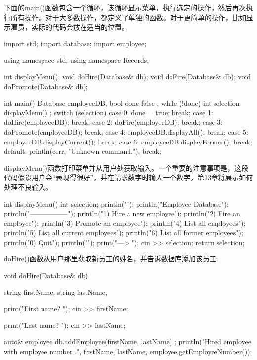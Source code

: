 下面的main()函数包含一个循环，该循环显示菜单，执行选定的操作，然后再次执行所有操作。对于大多数操作，都定义了单独的函数。对于更简单的操作，比如显示雇员，实际的代码会放在适当的位置。

\begin{cpp}
import std;
import database;
import employee;

using namespace std;
using namespace Records;

int displayMenu();
void doHire(Database& db);
void doFire(Database& db);
void doPromote(Database& db);

int main()
{
    Database employeeDB;
    bool done { false };
    while (!done) {
        int selection { displayMenu() };
        switch (selection) {
        case 0:
            done = true;
            break;
        case 1:
            doHire(employeeDB);
            break;
        case 2:
            doFire(employeeDB);
            break;
        case 3:
            doPromote(employeeDB);
            break;
        case 4:
            employeeDB.displayAll();
            break;
        case 5:
            employeeDB.displayCurrent();
            break;
        case 6:
            employeeDB.displayFormer();
            break;
        default:
            println(cerr, "Unknown command.");
            break;
        }
    }
}
\end{cpp}

displayMenu()函数打印菜单并从用户处获取输入。一个重要的注意事项是，这段代码假设用户会“表现得很好”，并在请求数字时输入一个数字。第13章将展示如何处理不良输入。

\begin{cpp}
int displayMenu()
{
    int selection;
    println("");
    println("Employee Database");
    println("-----------------");
    println("1) Hire a new employee");
    println("2) Fire an employee");
    println("3) Promote an employee");
    println("4) List all employees");
    println("5) List all current employees");
    println("6) List all former employees");
    println("0) Quit");
    println("");
    print("---> ");
    cin >> selection;
    return selection;
}
\end{cpp}

doHire()函数从用户那里获取新员工的姓名，并告诉数据库添加该员工:

\begin{cpp}
void doHire(Database& db)
{
    string firstName;
    string lastName;

    print("First name? ");
    cin >> firstName;

    print("Last name? ");
    cin >> lastName;

    auto& employee { db.addEmployee(firstName, lastName) };
    println("Hired employee {} {} with employee number {}.",
        firstName, lastName, employee.getEmployeeNumber());
}
\end{cpp}

